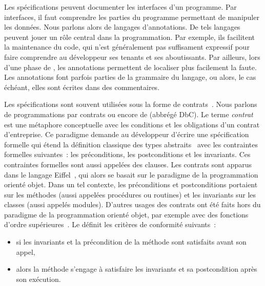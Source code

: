 Les spécifications peuvent documenter les {\strong interfaces} d'un programme.
Par interfaces, il faut comprendre les parties du programme permettant de
manipuler les données. Nous parlons alors de {\strong langages d'annotations}.
De tels langages peuvent jouer un rôle central dans la programmation. Par
exemple, ils facilitent la maintenance du code, qui n'est généralement pas
suffisament expressif pour faire comprendre au développeur ses tenants et ses
aboutissants. Par ailleurs, lors d'une phase de , les
annotations permettent de localiser plus facilement la faute. Les annotations
font parfois parties de la grammaire du langage, ou alors, le cas échéant, elles
sont écrites dans des {\strong commentaires}.

Les spécifications sont souvent utilisées sous la forme de {\strong
contrats}~. Nous parlons de programmations par contrats
ou encore de  (abbrégé DbC). Le terme {\em
contrat} est une métaphore conceptuelle avec les conditions et les obligations
d'un contrat d'entreprise. Ce paradigme demande au développeur d'écrire une
spécification formelle qui étend la définition classique des types
abstraits~ avec les contraintes formelles suivantes~: les
{\strong préconditions}, les {\strong postconditions} et les {\strong
invariants}. Ces contraintes formelles sont aussi appelées des {\strong
clauses}. Les contrats sont apparus dans le langage Eiffel~,
qui alors se basait sur le paradigme de la programmation orienté objet. Dans un
tel contexte, les préconditions et postconditions portaient sur les méthodes
(aussi appelées procédures ou routines) et les invariants sur les classes (aussi
appelés modules). D'autres usages des contrats ont été faits hors du paradigme
de la programmation orienté objet, par exemple avec des fonctions d'ordre
supérieures~.  Le  définit les
critères de conformité suivants~:

\begin{itemize}

\item si les invariants et la précondition de la méthode sont satisfaits avant
son appel,

\item alors la méthode s'engage à satisfaire les invariants et sa postcondition
après son exécution.

\end{itemize}

